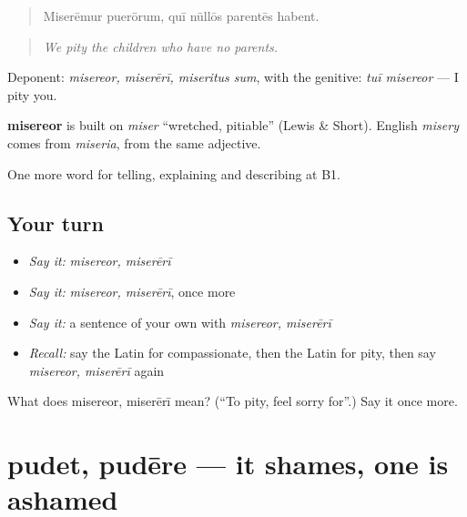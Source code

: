 \begin{quote}
Miserēmur puerōrum, quī nūllōs parentēs habent.
\end{quote}

\begin{quote}
\emph{We pity the children who have no parents.}
\end{quote}

Deponent: \emph{misereor, miserērī, miseritus sum}, with the genitive: \emph{tuī misereor} — I pity you.

\begin{cousinweb}
\textbf{misereor} is built on \emph{miser} \textquotedblleft{}wretched, pitiable\textquotedblright{} (Lewis \& Short). English \emph{misery} comes from \emph{miseria}, from the same adjective.
\end{cousinweb}

\begin{grammarlens}[title={What you've built}]
One more word for telling, explaining and describing at B1.
\end{grammarlens}

\subsection*{Your turn}
\begin{itemize}
\raggedright
  \item \emph{Say it:} \emph{misereor, miserērī}
  \item \emph{Say it:} \emph{misereor, miserērī}, once more
  \item \emph{Say it:} a sentence of your own with \emph{misereor, miserērī}
  \item \emph{Recall:} say the Latin for compassionate, then the Latin for pity, then say \emph{misereor, miserērī} again
\end{itemize}

\begin{tcolorbox}[breakable,colback=teal!4,colframe=teal!35!black,title={Before you move on}]
What does misereor, miserērī mean? (\textquotedblleft{}To pity, feel sorry for\textquotedblright{}.) Say it once more.
\end{tcolorbox}
\section[pudet, pudēre]{pudet, pudēre — it shames, one is ashamed}

\label{lesson:LA-C513-pudet}



